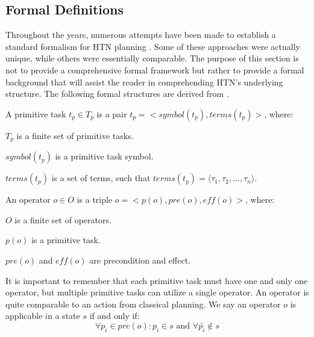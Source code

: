 \subsection{Formal Definitions}
Throughout the years, numerous attempts have been made to establish a standard formalism for HTN planning \cite{bercher_survey_2019}. Some of these approaches were actually unique, while others were essentially comparable. The purpose of this section is not to provide a comprehensive formal framework but rather to provide a formal background that will assist the reader in comprehending HTN's underlying structure. The following formal structures are derived from \cite{OverviewHierarchicalTaskgeorgievski2014} \cite{alnazer2019htn}.

\begin{Tdef}
    A primitive task  $t_p \in T_p$ is a pair $t_p = <symbol(t_p),terms(t_p)>$, where:
    \vspace{-0.5em}
    \begin{compactitem}
    \item 
    $T_p$ is a finite set of primitive tasks.
    \item 
    $symbol(t_p)$ is a primitive task symbol.
    \item 
    $terms(t_p)$  is a set of terms, such that $terms(t_p) = \langle \tau_1, \tau_2, \dots, \tau_n \rangle$.
    \end{compactitem}
\end{Tdef}

\begin{Tdef}[Operator]
    An operator $o \in O$ is a triple $o = <p(o), pre(o), eff(o)>$, where:
    \vspace{-0.5em}
    \begin{compactitem}
    \item 
    $O$ is a finite set of operators.
    \item 
    $p(o)$ is a primitive task.
    \item 
    $pre(o)$ and $eff(o)$ are precondition and effect.
    \end{compactitem}
    It is important to remember that each primitive task must have one and only one operator, but multiple primitive tasks can utilize a single operator. An operator is quite comparable to an action from classical planning. We say an operator $o$ is applicable in a state $s$ if and only if:
    \vspace{-0.5em}
    $$\forall p_i \in pre(o): p_i\in s \text{ and } \forall \bar{p_i} \notin s$$
\end{Tdef}

